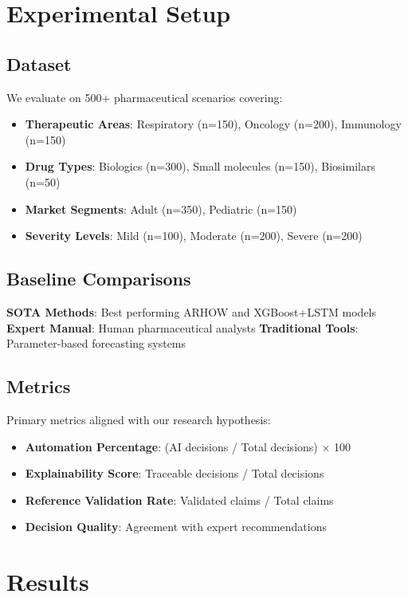 \documentclass{article}
\begin{document}
\section{Experimental Setup}

\subsection{Dataset}

We evaluate on 500+ pharmaceutical scenarios covering:
\begin{itemize}
    \item \textbf{Therapeutic Areas}: Respiratory (n=150), Oncology (n=200), Immunology (n=150)
    \item \textbf{Drug Types}: Biologics (n=300), Small molecules (n=150), Biosimilars (n=50)
    \item \textbf{Market Segments}: Adult (n=350), Pediatric (n=150)
    \item \textbf{Severity Levels}: Mild (n=100), Moderate (n=200), Severe (n=200)
\end{itemize}

\subsection{Baseline Comparisons}

\textbf{SOTA Methods}: Best performing ARHOW and XGBoost+LSTM models
\textbf{Expert Manual}: Human pharmaceutical analysts
\textbf{Traditional Tools}: Parameter-based forecasting systems

\subsection{Metrics}

Primary metrics aligned with our research hypothesis:
\begin{itemize}
    \item \textbf{Automation Percentage}: (AI decisions / Total decisions) × 100
    \item \textbf{Explainability Score}: Traceable decisions / Total decisions
    \item \textbf{Reference Validation Rate}: Validated claims / Total claims
    \item \textbf{Decision Quality}: Agreement with expert recommendations
\end{itemize}

\section{Results}
\end{document}
